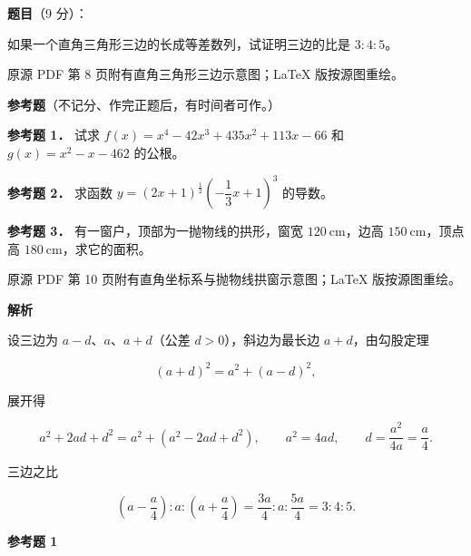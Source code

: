 \begin{answer}

\textbf{题目}（9 分）：

如果一个直角三角形三边的长成等差数列，试证明三边的比是 $3:4:5$。

\begin{gktip}
原源 PDF 第 8 页附有直角三角形三边示意图；LaTeX 版按源图重绘。
\end{gktip}
\nopagebreak[4]
\begin{center}\end{center}
\nopagebreak[4]
\begin{gktip}
\textbf{参考题}（不记分、作完正题后，有时间者可作。）
\end{gktip}

\textbf{参考题 1．} 试求 $f(x)=x^4-42x^3+435x^2+113x-66$ 和 $g(x)=x^2-x-462$ 的公根。

\textbf{参考题 2．} 求函数 $y=\left(2x+1\right)^{\frac12}\left(-\dfrac13x+1\right)^3$ 的导数。

\textbf{参考题 3．} 有一窗户，顶部为一抛物线的拱形，窗宽 $120\ \mathrm{cm}$，边高 $150\ \mathrm{cm}$，顶点高 $180\ \mathrm{cm}$，求它的面积。

\begin{gktip}
原源 PDF 第 10 页附有直角坐标系与抛物线拱窗示意图；LaTeX 版按源图重绘。
\end{gktip}
\nopagebreak[4]
\begin{center}\end{center}
\nopagebreak[4]
\textbf{解析}

设三边为 $a-d$、$a$、$a+d$（公差 $d>0$），斜边为最长边 $a+d$，由勾股定理

\nopagebreak[4]
\[
(a+d)^2=a^2+(a-d)^2,
\]

展开得

\nopagebreak[4]
\[
a^2+2ad+d^2=a^2+(a^2-2ad+d^2),
\qquad
a^2=4ad,
\qquad
d=\frac{a^2}{4a}=\frac{a}{4}.
\]

三边之比

\nopagebreak[4]
\[
\left(a-\frac{a}{4}\right):a:\left(a+\frac{a}{4}\right)
=\frac{3a}{4}:a:\frac{5a}{4}
=3:4:5.
\]
\nopagebreak[4]
\begin{center}\end{center}
\nopagebreak[4]
\textbf{参考题 1}


\end{answer}
